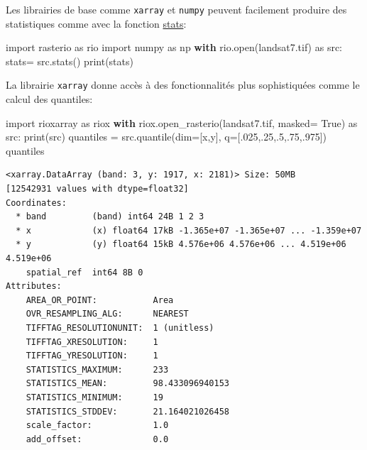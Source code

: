 \documentclass[
  11pt,
  letterpaper,
  open=any,
  twoside=false,
  french]{scrbook}
\newenvironment{Shaded}{\begin{snugshade}}{\end{snugshade}}
\newcommand{\BuiltInTok}[1]{\textcolor[rgb]{0.00,0.23,0.31}{#1}}
\newcommand{\ControlFlowTok}[1]{\textcolor[rgb]{0.00,0.23,0.31}{\textbf{#1}}}
\newcommand{\FloatTok}[1]{\textcolor[rgb]{0.68,0.00,0.00}{#1}}
\newcommand{\ImportTok}[1]{\textcolor[rgb]{0.00,0.46,0.62}{#1}}
\newcommand{\NormalTok}[1]{\textcolor[rgb]{0.00,0.23,0.31}{#1}}
\newcommand{\OperatorTok}[1]{\textcolor[rgb]{0.37,0.37,0.37}{#1}}
\newcommand{\StringTok}[1]{\textcolor[rgb]{0.13,0.47,0.30}{#1}}
\newcommand{\VariableTok}[1]{\textcolor[rgb]{0.07,0.07,0.07}{#1}}
\begin{document}
Les librairies de base comme \texttt{xarray} et \texttt{numpy} peuvent
facilement produire des statistiques comme avec la fonction
\href{https://rasterio.readthedocs.io/en/stable/api/rasterio.io.html\#rasterio.io.BufferedDatasetWriter.stats}{stats}:

\begin{Shaded}
\begin{Highlighting}[]
\ImportTok{import}\NormalTok{ rasterio }\ImportTok{as}\NormalTok{ rio}
\ImportTok{import}\NormalTok{ numpy }\ImportTok{as}\NormalTok{ np}
\ControlFlowTok{with}\NormalTok{ rio.}\BuiltInTok{open}\NormalTok{(}\StringTok{\textquotesingle{}landsat7.tif\textquotesingle{}}\NormalTok{) }\ImportTok{as}\NormalTok{ src:}
\NormalTok{    stats}\OperatorTok{=}\NormalTok{ src.stats()}
    \BuiltInTok{print}\NormalTok{(stats)}
\end{Highlighting}
\end{Shaded}

La librairie \texttt{xarray} donne accès à des fonctionnalités plus
sophistiquées comme le calcul des quantiles:

\begin{Shaded}
\begin{Highlighting}[]
\ImportTok{import}\NormalTok{ rioxarray }\ImportTok{as}\NormalTok{ riox}
\ControlFlowTok{with}\NormalTok{ riox.open\_rasterio(}\StringTok{\textquotesingle{}landsat7.tif\textquotesingle{}}\NormalTok{, masked}\OperatorTok{=} \VariableTok{True}\NormalTok{) }\ImportTok{as}\NormalTok{ src:}
    \BuiltInTok{print}\NormalTok{(src)}
\NormalTok{quantiles }\OperatorTok{=}\NormalTok{ src.quantile(dim}\OperatorTok{=}\NormalTok{[}\StringTok{\textquotesingle{}x\textquotesingle{}}\NormalTok{,}\StringTok{\textquotesingle{}y\textquotesingle{}}\NormalTok{], q}\OperatorTok{=}\NormalTok{[}\FloatTok{.025}\NormalTok{,}\FloatTok{.25}\NormalTok{,}\FloatTok{.5}\NormalTok{,}\FloatTok{.75}\NormalTok{,}\FloatTok{.975}\NormalTok{])}
\NormalTok{quantiles}
\end{Highlighting}
\end{Shaded}

\begin{verbatim}
<xarray.DataArray (band: 3, y: 1917, x: 2181)> Size: 50MB
[12542931 values with dtype=float32]
Coordinates:
  * band         (band) int64 24B 1 2 3
  * x            (x) float64 17kB -1.365e+07 -1.365e+07 ... -1.359e+07
  * y            (y) float64 15kB 4.576e+06 4.576e+06 ... 4.519e+06 4.519e+06
    spatial_ref  int64 8B 0
Attributes:
    AREA_OR_POINT:           Area
    OVR_RESAMPLING_ALG:      NEAREST
    TIFFTAG_RESOLUTIONUNIT:  1 (unitless)
    TIFFTAG_XRESOLUTION:     1
    TIFFTAG_YRESOLUTION:     1
    STATISTICS_MAXIMUM:      233
    STATISTICS_MEAN:         98.433096940153
    STATISTICS_MINIMUM:      19
    STATISTICS_STDDEV:       21.164021026458
    scale_factor:            1.0
    add_offset:              0.0
\end{verbatim}
\end{document}
